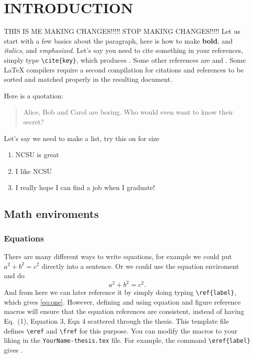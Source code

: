 \chapter{INTRODUCTION}
\label{chap-one}
THIS IS ME MAKING CHANGES!!!!! STOP MAKING CHANGES!!!!!
Let us start with a few basics about the paragraph, here is how to make \textbf{bold}, 
and \textit{italics}, and \emph{emphasized}.  Let's say you need to cite 
something in your references, simply type \verb^\cite{key}^, which produces
\cite{einstein1935particle}.  
Some other references are \cite{golub1996matrix} and 
\cite{larsen1974asymptotic}.
Some \LaTeX{} compilers 
require a second compilation for citations and references 
to be sorted and matched properly in the resulting document.  

Here is a quotation:
\begin{quotation}
Alice, Bob and Carol are boring.  Who would even want to know their secret?
\end{quotation}

Let's say we need to make a list, try this on for size
\begin{enumerate}
  \item NCSU is great
  \item I like NCSU
  \item I really hope I can find a job when I graduate!
\end{enumerate} 

\section{Math enviroments}
\subsection{Equations}

There are many different ways to write equations, for example we could put 
$a^2 + b^2 = c^2$ directly into a sentence.  Or we could use the equation 
enviroment and do 
%
\begin{equation}
  a^2+b^2=c^2.
  \label{eq:one}
\end{equation} 
And from here we can later reference it by simply doing typing 
\verb^\ref{label}^, which gives \ref{eq:one}.  However, defining and using
equation and figure reference macros will ensure that the equation
references are consistent, instead of having Eq.~(1), Equation 3, Eqn 4
scattered through the thesis.  This template file defines \verb^\eref^
and \verb^\fref^ for this purpose. You can modify the macros to your liking
in the \texttt{YourName-thesis.tex} file.
For example, the command \verb^\eref{label}^ gives .


